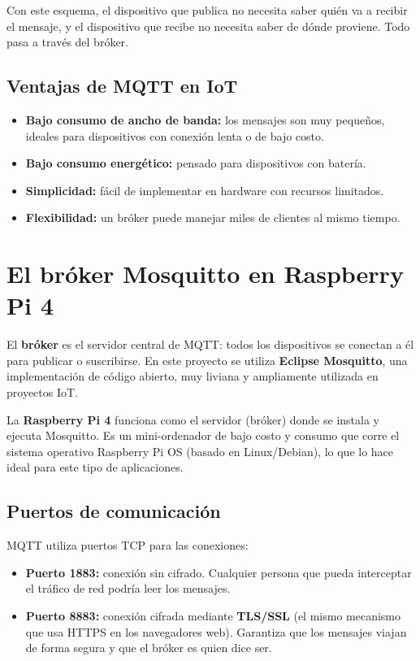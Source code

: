 \documentclass[12pt,a4paper]{article}
\begin{document}
Con este esquema, el dispositivo que publica no necesita saber quién va a
recibir el mensaje, y el dispositivo que recibe no necesita saber de dónde
proviene. Todo pasa a través del bróker.

\subsection{Ventajas de MQTT en IoT}

\begin{itemize}
  \item \textbf{Bajo consumo de ancho de banda:} los mensajes son muy pequeños,
    ideales para dispositivos con conexión lenta o de bajo costo.
  \item \textbf{Bajo consumo energético:} pensado para dispositivos con batería.
  \item \textbf{Simplicidad:} fácil de implementar en hardware con recursos
    limitados.
  \item \textbf{Flexibilidad:} un bróker puede manejar miles de clientes al
    mismo tiempo.
\end{itemize}

\section{El bróker Mosquitto en Raspberry Pi 4}

El \textbf{bróker} es el servidor central de MQTT: todos los dispositivos se
conectan a él para publicar o suscribirse. En este proyecto se utiliza
\textbf{Eclipse Mosquitto}, una implementación de código abierto, muy liviana y
ampliamente utilizada en proyectos IoT.

La \textbf{Raspberry Pi 4} funciona como el servidor (bróker) donde se instala y
ejecuta Mosquitto. Es un mini-ordenador de bajo costo y consumo que corre el
sistema operativo Raspberry Pi OS (basado en Linux/Debian), lo que lo hace ideal
para este tipo de aplicaciones.

\subsection{Puertos de comunicación}

MQTT utiliza puertos TCP para las conexiones:

\begin{itemize}
  \item \textbf{Puerto 1883:} conexión sin cifrado. Cualquier persona que pueda
    interceptar el tráfico de red podría leer los mensajes.
  \item \textbf{Puerto 8883:} conexión cifrada mediante \textbf{TLS/SSL}
    (el mismo mecanismo que usa HTTPS en los navegadores web). Garantiza que
    los mensajes viajan de forma segura y que el bróker es quien dice ser.
\end{itemize}
\end{document}
